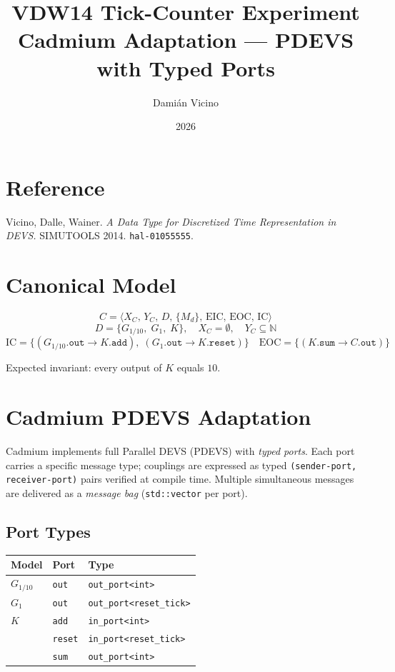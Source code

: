 \documentclass[11pt,a4paper]{article}
\title{VDW14 Tick-Counter Experiment\\
  \large Cadmium Adaptation --- PDEVS with Typed Ports}
\author{Damián Vicino}
\date{2026}
\begin{document}
\maketitle

\section*{Reference}
Vicino, Dalle, Wainer.
\textit{A Data Type for Discretized Time Representation in DEVS.}
SIMUTOOLS 2014. \texttt{hal-01055555}.

\section*{Canonical Model}

\[
  C = \langle X_C,\, Y_C,\, D,\, \{M_d\},\, \text{EIC},\, \text{EOC},\, \text{IC} \rangle
\]
\[
  D = \{G_{1/10},\; G_{1},\; K\},\quad
  X_C = \emptyset,\quad
  Y_C \subseteq \mathbb{N}
\]
\[
  \text{IC} = \{(G_{1/10}.\texttt{out} \to K.\texttt{add}),\;
               (G_{1}.\texttt{out} \to K.\texttt{reset})\}
  \quad
  \text{EOC} = \{(K.\texttt{sum} \to C.\texttt{out})\}
\]

Expected invariant: every output of $K$ equals $10$.

\section*{Cadmium PDEVS Adaptation}

Cadmium implements full Parallel DEVS (PDEVS) with \emph{typed ports}.  Each
port carries a specific message type; couplings are expressed as typed
\texttt{(sender-port, receiver-port)} pairs verified at compile time.
Multiple simultaneous messages are delivered as a \emph{message bag}
(\texttt{std::vector} per port).

\subsection*{Port Types}

\begin{center}
\begin{tabular}{@{}lll@{}}
  \toprule
  Model & Port & Type \\
  \midrule
  $G_{1/10}$ & \texttt{out}   & \texttt{out\_port<int>} \\
  $G_{1}$    & \texttt{out}   & \texttt{out\_port<reset\_tick>} \\
  $K$        & \texttt{add}   & \texttt{in\_port<int>} \\
             & \texttt{reset} & \texttt{in\_port<reset\_tick>} \\
             & \texttt{sum}   & \texttt{out\_port<int>} \\
  \bottomrule
\end{tabular}
\end{center}
\end{document}
